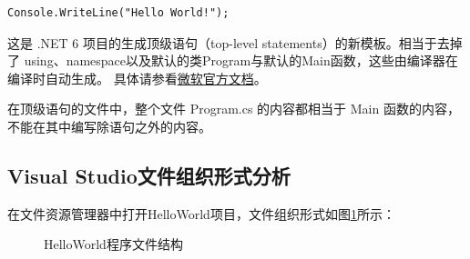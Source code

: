 \begin{lstlisting}
Console.WriteLine("Hello World!");
\end{lstlisting}

这是 .NET 6 项目的生成顶级语句（top-level statements）的新模板。相当于去掉了
using、namespace以及默认的类Program与默认的Main函数，这些由编译器在编译时自动生成。
具体请参看\href{https://docs.microsoft.com/en-us/dotnet/core/tutorials/top-level-templates}{微软官方文档}。

在顶级语句的文件中，整个文件 Program.cs 的内容都相当于 Main 函数的内容，不能在其中编写除语句之外的内容。

\subsection{Visual Studio文件组织形式分析}
在文件资源管理器中打开HelloWorld项目，文件组织形式如图\ref{fig:HelloWorldProj}所示：

\begin{figure}[htbp]
\centering
{}
\hspace{20pt}%
\caption{HelloWorld程序文件结构}
\label{fig:HelloWorldProj}
\end{figure}

